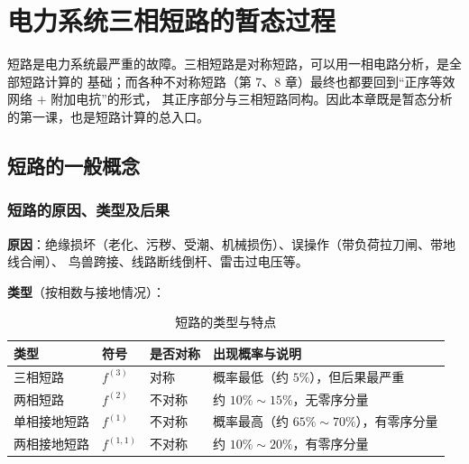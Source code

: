 
\chapter{电力系统三相短路的暂态过程}

短路是电力系统最严重的故障。三相短路是对称短路，可以用一相电路分析，是全部短路计算的
基础；而各种不对称短路（第 7、8 章）最终也都要回到“正序等效网络 $+$ 附加电抗”的形式，
其正序部分与三相短路同构。因此本章既是暂态分析的第一课，也是短路计算的总入口。

\section{短路的一般概念}

\subsection{短路的原因、类型及后果}

\textbf{原因}：绝缘损坏（老化、污秽、受潮、机械损伤）、误操作（带负荷拉刀闸、带地线合闸）、
鸟兽跨接、线路断线倒杆、雷击过电压等。

\textbf{类型}（按相数与接地情况）：

\begin{table}[htbp]
  \centering
  \caption{短路的类型与特点}
  \small
  \begin{tabular}{@{}llll@{}}
    \toprule
    类型 & 符号 & 是否对称 & 出现概率与说明 \\
    \midrule
    三相短路 & $f^{(3)}$ & 对称 & 概率最低（约 $5\%$），但后果最严重 \\
    两相短路 & $f^{(2)}$ & 不对称 & 约 $10\%\sim15\%$，无零序分量 \\
    单相接地短路 & $f^{(1)}$ & 不对称 & 概率最高（约 $65\%\sim70\%$），有零序分量 \\
    两相接地短路 & $f^{(1,1)}$ & 不对称 & 约 $10\%\sim20\%$，有零序分量 \\
    \bottomrule
  \end{tabular}
\end{table}


